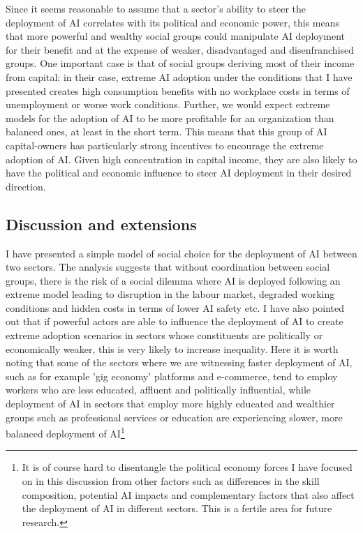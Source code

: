 \documentclass[11pt]{article}
\begin{document}
Since it seems reasonable to assume that a sector's ability to steer the deployment of AI correlates with its political and economic power, this means that more powerful and wealthy social groups could manipulate AI deployment for their benefit and at the expense of weaker, disadvantaged and disenfranchised groups. One important case is that of social groups deriving most of their income from capital: in their case, extreme AI adoption under the conditions that I have presented creates high consumption benefits with no workplace costs in terms of unemployment or worse work conditions. Further, we would expect extreme models for the adoption of AI to be more profitable for an organization than balanced ones, at least in the short term. This means that this group of AI capital-owners has particularly strong incentives to encourage the extreme adoption of AI. Given high concentration in capital income, they are also likely to have the political and economic influence to steer AI deployment in their desired direction.

\subsection{Discussion and extensions}
\label{subsec:macro_outcomes}
I have presented a simple model of social choice for the deployment of AI between two sectors. The analysis suggests that without coordination between social groups, there is the risk of a social dilemma where AI is deployed following an extreme model leading to disruption in the labour market, degraded working conditions and hidden costs in terms of lower AI safety etc. I have also pointed out that if powerful actors are able to influence the deployment of AI to create extreme adoption scenarios in sectors whose constituents are politically or economically weaker, this is very likely to increase inequality. Here it is worth noting that some of the sectors where we are witnessing faster deployment of AI, such as for example 'gig economy' platforms and e-commerce, tend to employ workers who are less educated, affluent and politically influential, while deployment of AI in sectors that employ more highly educated and wealthier groups such as professional services or education are experiencing slower, more balanced deployment of AI\footnote{It is of course hard to disentangle the political economy forces I have focused on in this discussion from other factors such as differences in the skill composition, potential AI impacts and complementary factors that also affect the deployment of AI in different sectors. This is a fertile area for future research.}
\end{document}

